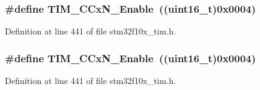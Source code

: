 \subsubsection[{\texorpdfstring{T\+I\+M\+\_\+\+C\+Cx\+N\+\_\+\+Enable}{TIM_CCxN_Enable}}]{\setlength{\rightskip}{0pt plus 5cm}\#define T\+I\+M\+\_\+\+C\+Cx\+N\+\_\+\+Enable~(({\bf uint16\+\_\+t})0x0004)}\hypertarget{group___t_i_m___capture___compare___n__state_gab534ddf23d317eb912564292c1cede2d}{}\label{group___t_i_m___capture___compare___n__state_gab534ddf23d317eb912564292c1cede2d}


Definition at line 441 of file stm32f10x\+\_\+tim.\+h.

\subsubsection[{\texorpdfstring{T\+I\+M\+\_\+\+C\+Cx\+N\+\_\+\+Enable}{TIM_CCxN_Enable}}]{\setlength{\rightskip}{0pt plus 5cm}\#define T\+I\+M\+\_\+\+C\+Cx\+N\+\_\+\+Enable~(({\bf uint16\+\_\+t})0x0004)}\hypertarget{group___t_i_m___capture___compare___n__state_gab534ddf23d317eb912564292c1cede2d}{}\label{group___t_i_m___capture___compare___n__state_gab534ddf23d317eb912564292c1cede2d}


Definition at line 441 of file stm32f10x\+\_\+tim.\+h.

